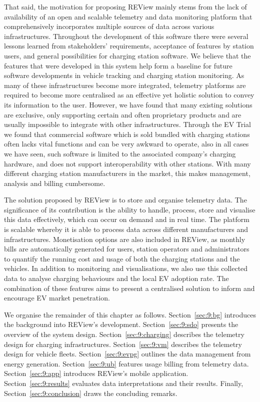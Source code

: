 That said, the motivation for proposing REView mainly stems from the lack of availability of an open and scalable telemetry and data monitoring platform that comprehensively incorporates multiple sources of data across various infrastructures. Throughout the development of this software there were several lessons learned from stakeholders’ requirements, acceptance of features by station users, and general possibilities for charging station software. We believe that the features that were developed in this system help form a baseline for future software developments in vehicle tracking and charging station monitoring. As many of these infrastructures become more integrated, telemetry platforms are required to become more centralised as an effective yet holistic solution to convey its information to the user. However, we have found that many existing solutions are exclusive, only supporting certain and often proprietary products and are usually impossible to integrate with other infrastructures. Through the EV Trial we found that commercial software which is sold bundled with charging stations often lacks vital functions and can be very awkward to operate, also in all cases we have seen, such software is limited to the associated company’s charging hardware, and does not support interoperability with other stations. With many different charging station manufacturers in the market, this makes management, analysis and billing cumbersome. 

The solution proposed by REView is to store and organise telemetry data. The significance of its contribution is the ability to handle, process, store and visualise this data effectively, which can occur on demand and in real time. The platform is scalable whereby it is able to process data across different manufacturers and infrastructures. Monetisation options are also included in REView, as monthly bills are automatically generated for users, station operators and administrators to quantify the running cost and usage of both the charging stations and the vehicles. In addition to monitoring and visualisations, we also use this collected data to analyse charging behaviours and the local EV adoption rate. The combination of these features aims to present a centralised solution to inform and encourage EV market penetration.

We organise the remainder of this chapter as follows. Section~\ref{sec:9:bg} introduces the background into REView’s development. Section~\ref{sec:9:sdo} presents the overview of the system design. Section~\ref{sec:9:charging} describes the telemetry design for charging infrastructures. Section~\ref{sec:9:vm} describes the telemetry design for vehicle fleets. Section~\ref{sec:9:evpg} outlines the data management from energy generation. Section~\ref{sec:9:ub} features usage billing from telemetry data. Section~\ref{sec:9:app} introduces REView’s mobile application. Section~\ref{sec:9:results} evaluates data interpretations and their results. Finally, Section~\ref{sec:9:conclusion} draws the concluding remarks. 

